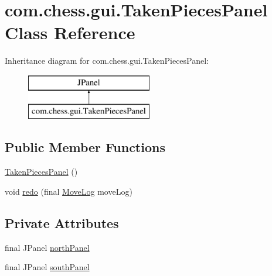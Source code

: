 \hypertarget{classcom_1_1chess_1_1gui_1_1_taken_pieces_panel}{}\section{com.\+chess.\+gui.\+Taken\+Pieces\+Panel Class Reference}
\label{classcom_1_1chess_1_1gui_1_1_taken_pieces_panel}
Inheritance diagram for com.\+chess.\+gui.\+Taken\+Pieces\+Panel\+:\begin{figure}[H]
\begin{center}
\leavevmode
\includegraphics[height=2.000000cm]{classcom_1_1chess_1_1gui_1_1_taken_pieces_panel}
\end{center}
\end{figure}
\subsection*{Public Member Functions}
\begin{DoxyCompactItemize}
\item 
\mbox{\hyperlink{classcom_1_1chess_1_1gui_1_1_taken_pieces_panel_ac5c360a659746379d05a6ffde442deb2}{Taken\+Pieces\+Panel}} ()
\item 
void \mbox{\hyperlink{classcom_1_1chess_1_1gui_1_1_taken_pieces_panel_ae473357a9f961ce9f8a32d5b222d4319}{redo}} (final \mbox{\hyperlink{classcom_1_1chess_1_1gui_1_1_table_1_1_move_log}{Move\+Log}} move\+Log)
\end{DoxyCompactItemize}
\subsection*{Private Attributes}
\begin{DoxyCompactItemize}
\item 
final J\+Panel \mbox{\hyperlink{classcom_1_1chess_1_1gui_1_1_taken_pieces_panel_a3f2a3e2adb0856b0c2d0e097e663f7ba}{north\+Panel}}
\item 
final J\+Panel \mbox{\hyperlink{classcom_1_1chess_1_1gui_1_1_taken_pieces_panel_a5117ba681f524c8930b45e7b9bcce3e0}{south\+Panel}}
\end{DoxyCompactItemize}
